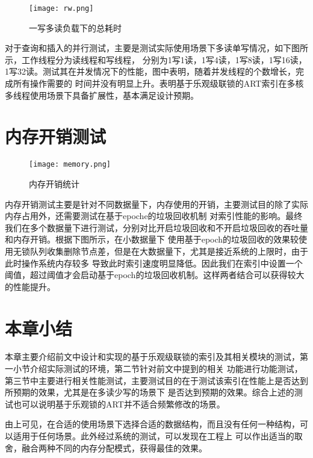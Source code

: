 \begin{figure}[H]
  \centering
  \texttt{[image: rw.png]}
  \caption{一写多读负载下的总耗时}
  \label{fig:rw}
\end{figure}

对于查询和插入的并行测试，主要是测试实际使用场景下多读单写情况，如下图所示，工作线程分为读线程和写线程，
分别为1写1读，1写4读，1写8读，1写16读，1写32读。测试其在并发情况下的性能，图中表明，随着并发线程的个数增长，完成所有操作需要的
时间并没有明显上升。表明基于乐观级联锁的ART索引在多核多线程使用场景下具备扩展性，基本满足设计预期。


\section{内存开销测试}

\begin{figure}[H]
  \centering
  \texttt{[image: memory.png]}
  \caption{内存开销统计}
  \label{fig:memory}
\end{figure}


内存开销测试主要是针对不同数据量下，内存使用的开销，主要测试目的除了实际内存占用外，还需要测试在基于epoche的垃圾回收机制
对索引性能的影响。最终我们在多个数据量下进行测试，分别对比开启垃圾回收和不开启垃圾回收的吞吐量和内存开销。根据下图所示，在小数据量下
使用基于epoch的垃圾回收的效果较使用无锁队列收集删除节点差，但是在大数据量下，尤其是接近系统的上限时，由于此时操作系统内存较多
导致此时索引速度明显降低。因此我们在索引中设置一个阈值，超过阈值才会启动基于epoch的垃圾回收机制。这样两者结合可以获得较大的性能提升。

\section{本章小结}

本章主要介绍前文中设计和实现的基于乐观级联锁的索引及其相关模块的测试，第一小节介绍实际测试的环境，第二节针对前文中提到的相关
功能进行功能测试，第三节中主要进行相关性能测试，主要测试目的在于测试该索引在性能上是否达到所预期的效果，尤其是在多读少写的场景下
是否达到预期的效果。综合上述的测试也可以说明基于乐观锁的ART并不适合频繁修改的场景。

由上可见，在合适的使用场景下选择合适的数据结构，而且没有任何一种结构，可以适用于任何场景。此外经过系统的测试，可以发现在工程上
可以作出适当的取舍，融合两种不同的内存分配模式，获得最佳的效果。
